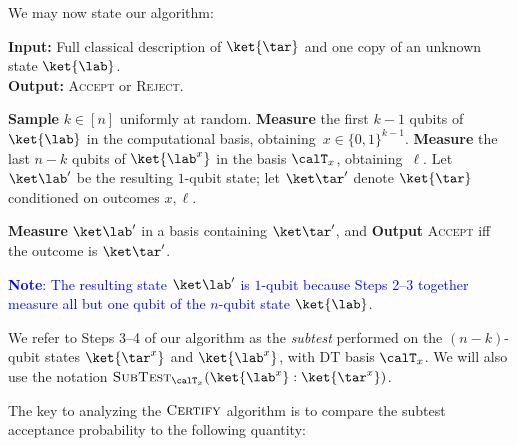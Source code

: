 We may now state our algorithm:

\begin{algorithm}[H]
    \vspace{0.3em}
    \textbf{Input:} Full classical description of $\ket{\tar}$ and one copy of an unknown state $\ket{\lab}$. \\
    \textbf{Output:} \textsc{Accept} or \textsc{Reject}.
    \begin{algorithmic}[1]
    \State \textbf{Sample} $k\in[n]$ uniformly at random.
    \State \textbf{Measure} the first $k-1$ qubits of $\ket{\lab}$ in the computational basis, obtaining~$x\in\{0,1\}^{k-1}$.    
    \State \textbf{Measure} the last $n-k$ qubits of $\ket{\lab^x}$ in the basis $\calT_x$, obtaining~$\ell$.
    \State Let $\labline$ be the resulting $1$-qubit state; let $\tarline$ denote $\ket{\tar}$ conditioned on outcomes $x, \ell$.
    
    \noindent \textbf{Measure} $\labline$ in a basis containing $\tarline$, %
    and \textbf{Output} \textsc{Accept} iff the outcome is $\tarline$.
    \end{algorithmic}
    \caption{\textsc{Certify}$(\ket{\lab}, \ket{\tar})$}
    \label{alg:main}
\end{algorithm}

\textcolor{blue}{\textbf{Note}: The resulting state $\labline$ is $1$-qubit because Steps 2--3 together measure all but one qubit of the $n$-qubit state $\ket{\lab}$.} 
\begin{definition}
    We refer to Steps 3--4 of our algorithm as the \emph{subtest} performed on the \mbox{$(n-k)$}-qubit states $\ket{\tar^x}$ and $\ket{\lab^x}$, with DT basis $\calT_x$.  We will also use the notation $\textsc{SubTest}_{\calT_x}(\ket{\lab^x}: \ket{\smash{\tar^x}})$.
\end{definition}



The key to analyzing the $\textsc{Certify}$ algorithm is to compare the subtest acceptance probability %
to the following quantity:

